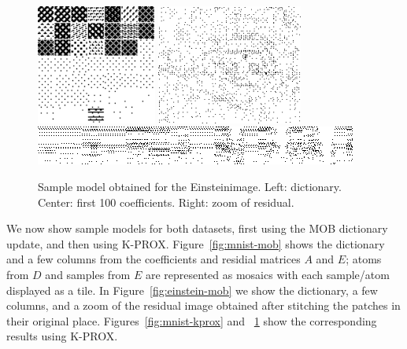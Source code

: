 \documentclass[twocolumn]{IEEEtran}
\theoremstyle{definition}
\begin{document}
\begin{figure}
\includegraphics[height=1.55in]{fig/einstein_kprox_dict.png} %
\includegraphics[height=1.55in]{fig/einstein_kprox_err_zoom.png}\\[1ex]
\includegraphics[width=\columnwidth]{fig/einstein_kprox_coef_crop.png}
\caption{\label{fig:einstein-kprox} Sample model obtained for the Einsteinimage. Left: dictionary. Center: first 100 coefficients. Right: zoom of residual. }
\end{figure}
%

We now show sample models for both datasets, first using the MOB dictionary update, and then using K-PROX. Figure~\ref{fig:mnist-mob} shows the dictionary and a few columns from the coefficients and residial matrices $A$ and $E$; atoms from $D$ and samples from $E$ are represented as mosaics with each sample/atom displayed as a tile. In Figure~\ref{fig:einstein-mob} we show the dictionary, a few columns, and a zoom of the residual image obtained after stitching the patches in their original place. Figures~\ref{fig:mnist-kprox} and ~\ref{fig:einstein-kprox} show the corresponding results using K-PROX.
\end{document}
